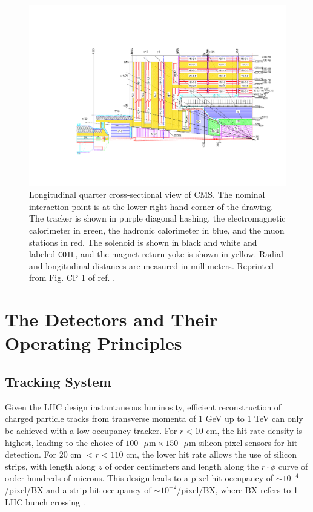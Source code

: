\documentclass[dissertation.tex]{subfiles}
\begin{document}
\begin{figure}
	\centering
	\includegraphics[scale=0.5]{CMS_longitudinal_xsec}
	\caption{Longitudinal quarter cross-sectional view of CMS.  The nominal interaction point is at the lower right-hand corner of the drawing.  The tracker is shown in purple diagonal hashing, the electromagnetic calorimeter in green, the hadronic calorimeter in blue, and the muon stations in red.  The solenoid is shown in black and white and labeled \texttt{COIL}, and the magnet return yoke is shown in yellow.  Radial and longitudinal distances are measured in millimeters.  Reprinted from Fig. CP 1 of ref. \cite{CMS_TDR}.}
	\label{fig:CMS_longitudinal_xsec}
\end{figure}

\section{The Detectors and Their Operating Principles}
\label{sec:The Detectors and Their Operating Principles}

\subsection{Tracking System}
\label{sec:Tracking System}

Given the LHC design instantaneous luminosity, efficient reconstruction of charged particle tracks from transverse momenta of 1 GeV up to 1 TeV can only be achieved with a low occupancy tracker.  For $r < 10$ cm, the hit rate density is highest, leading to the choice of $100\mbox{ }\mu\mbox{m} \times 150\mbox{ }\mu\mbox{m}$ silicon pixel sensors for hit detection.  For $20\mbox{ cm }< r < 110\mbox{ cm}$, the lower hit rate allows the use of silicon strips, with length along $z$ of order centimeters and length along the $r\cdot\phi$ curve of order hundreds of microns.  This design leads to a pixel hit occupancy of $\sim10^{-4}$/pixel/BX and a strip hit occupancy of $\sim10^{-2}$/pixel/BX, where BX refers to 1 LHC bunch crossing \cite{CMS_detector_paper}.
\end{document}
